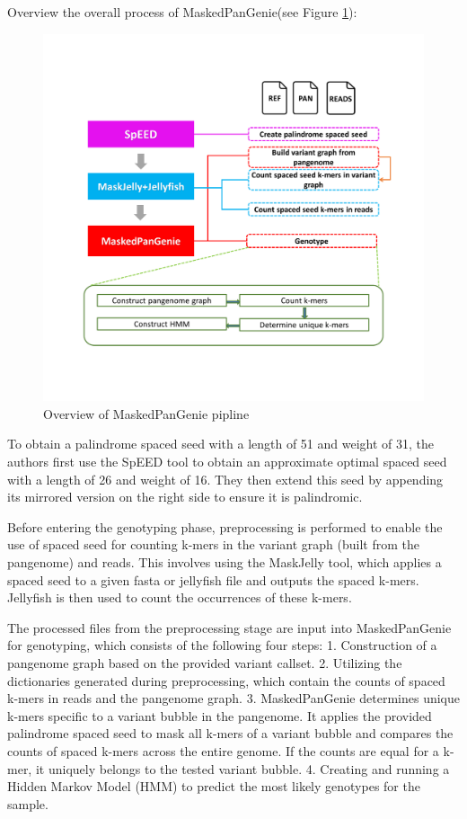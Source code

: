 \documentclass{PHlab-thesis}
\begin{document}
Overview the overall process of MaskedPanGenie(see Figure \ref{fig:MaskedPanGenie}):
\begin{figure}
	\centering
	\includegraphics[scale=0.18]{figures/MaskedPanGenie_pipeline.png}
	\caption{Overview of MaskedPanGenie pipline}
	\label{fig:MaskedPanGenie} %
\end{figure}

To obtain a palindrome spaced seed with a length of 51 and weight of 31, the authors first use the SpEED tool to obtain an approximate optimal spaced seed with a length of 26 and weight of 16. They then extend this seed by appending its mirrored version on the right side to ensure it is palindromic.

Before entering the genotyping phase, preprocessing is performed to enable the use of spaced seed for counting k-mers in the variant graph (built from the pangenome) and reads. This involves using the MaskJelly tool, which applies a spaced seed to a given fasta or jellyfish file and outputs the spaced k-mers. Jellyfish is then used to count the occurrences of these k-mers.

The processed files from the preprocessing stage are input into MaskedPanGenie for genotyping, which consists of the following four steps:
1. Construction of a pangenome graph based on the provided variant callset.
2. Utilizing the dictionaries generated during preprocessing, which contain the counts of spaced k-mers in reads and the pangenome graph.
3. MaskedPanGenie determines unique k-mers specific to a variant bubble in the pangenome. It applies the provided palindrome spaced seed to mask all k-mers of a variant bubble and compares the counts of spaced k-mers across the entire genome. If the counts are equal for a k-mer, it uniquely belongs to the tested variant bubble.
4. Creating and running a Hidden Markov Model (HMM) to predict the most likely genotypes for the sample.
\end{document}
